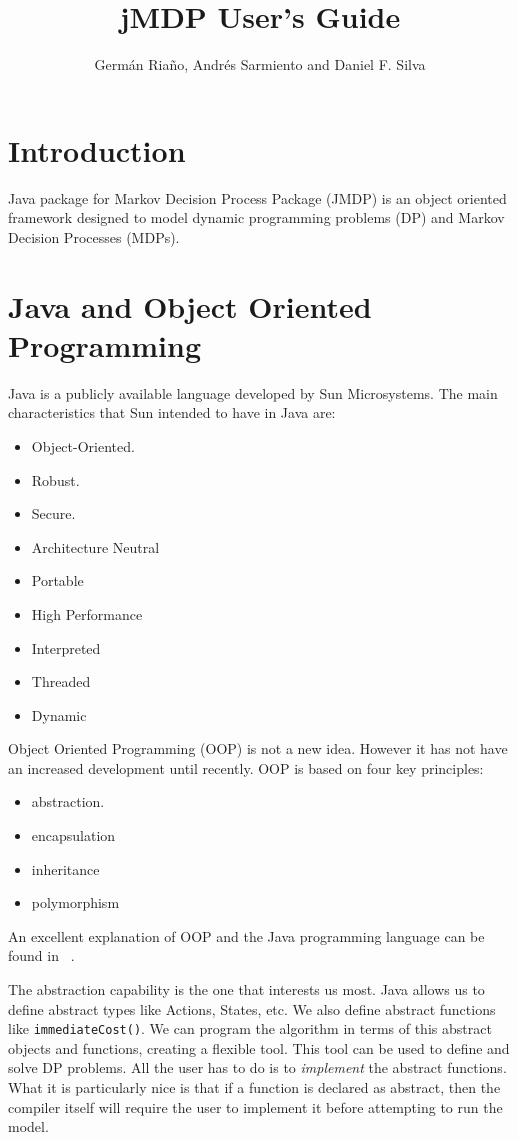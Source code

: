 \documentclass[11pt]{article}
\title{jMDP User's Guide}
\author{  Germ\'an Ria\~no, Andr\'es Sarmiento and Daniel F. Silva}
\date{}
\begin{document}

\maketitle
\tableofcontents

\section*{Introduction}

Java package for Markov Decision Process Package (JMDP) is an object oriented framework designed to model dynamic programming problems (DP) and Markov Decision Processes (MDPs).

\section{Java and Object Oriented Programming}


Java is a publicly available language developed by Sun
Microsystems. The main characteristics that Sun intended to have in Java
are:
\begin{itemize}
  \item Object-Oriented.
  \item Robust.
  \item Secure.
  \item Architecture Neutral
  \item Portable
  \item High Performance
  \item Interpreted
  \item Threaded
  \item Dynamic
\end{itemize}

Object Oriented Programming  (OOP) is not a new idea. However it has not
have an increased development until recently. OOP is based on four key
principles:
\begin{itemize}
  \item abstraction.
  \item encapsulation
  \item inheritance
  \item polymorphism
\end{itemize}

An excellent explanation of OOP and the Java programming language can be
found in ~\cite{ld:jj}.

The abstraction capability is the one that interests us most. Java allows us to define abstract types like Actions, States, etc. We also define abstract functions like \lstinline!immediateCost()!.  We can program the algorithm in terms of this abstract objects and functions, creating a flexible tool. This tool can be used to define and solve DP problems. All the user has to do is to \textit{implement} the abstract functions. What it is particularly nice is that if a function is declared as abstract, then the compiler itself will require the user to implement it before attempting to run the
model.
\end{document}
